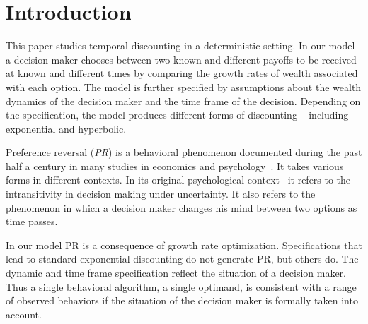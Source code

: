 \documentclass[11pt]{article}
\numberwithin{equation}{section}
\begin{document}
\section{Introduction}\label{sec:introduction}

This paper studies temporal discounting in a deterministic setting. In our model a decision maker chooses between two known and different payoffs to be received at known and different times by comparing the growth rates of wealth associated with each option. The model is further specified by assumptions about the wealth dynamics of the decision maker and the time frame of the decision. Depending on the specification, the model produces different forms of discounting -- including exponential and hyperbolic.

Preference reversal (\textit{PR}) is a behavioral phenomenon documented during the past half a century in many studies in economics and psychology~\citep{lichtenstein1971reversals,lindman1971inconsistent,grether1979economic,loomes1983rationale,tversky1990causes,ainslie1992picoeconomics,laibson1997golden}. It takes various forms in different contexts. In its original psychological context~\citep{tversky1969intransitivity,lichtenstein1971reversals} it refers to the intransitivity in decision making under uncertainty. It also refers to the phenomenon in which a decision maker changes his mind between two options as time passes. 

In our model PR is a consequence of growth rate optimization. Specifications that lead to standard exponential discounting do not generate PR, but others do. The dynamic and time frame specification reflect the situation of a decision maker. Thus a single behavioral algorithm, a single optimand, is consistent with a range of observed behaviors if the situation of the decision maker is formally taken into account.

\end{document}
